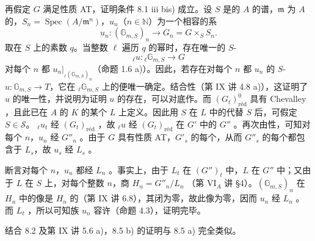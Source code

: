再假定 $G$ 满足性质 AT，证明条件 8.1 iii bis) 成立。设 $S$ 是的 $A$ 的谱，$\mathfrak m$ 为 $A$ 的，$S_n=\operatorname{Spec}(A/\mathfrak m^n)$，$u_n$（$n\in\mathbb N$）为一个相容的系
\[u_n:(\mathbb G_{m,S})_n\longrightarrow G_n=G\times_S S_n.\]
取在 $S$ 上的素数 $q$。当整数 $\ell$ 遍历 $q$ 的幂时，存在唯一的 $S$-
\[{}_\ell u:{}_\ell\mathbb G_{m,S}\longrightarrow G\]
对每个 $n$ 都 $u_n|_{{}_\ell(\mathbb G_{m,S})_n}$（命题 1.6 a)）。因此，若存在对每个 $n$ 都 $u_n$ 的 $S$- $u:\mathbb G_{m,S}\to T$，它在 ${}_\ell\mathbb G_{m,S}$ 上的便唯一确定。结合性（第 IX 讲 4.8 a)），这证明了
$u$ 的唯一性，并说明为证明 $u$ 的存在，可以对底作。而 $(G_t)^0_{\mathrm{r\text{é}d}}$ 具有 Chevalley ，且此已在 $A$ 的 $K$ 的某个 $L$ 上定义。因此用 $S$ 在 $L$ 中的代替 $S$ 后，可假定 $S\in\mathscr S$。 ${}_\ell u_t$ 经 $(G_t)_{\mathrm{r\text{é}d}}$ ，故 ${}_\ell u$ 经 $(G_t)_{\mathrm{r\text{é}d}}$ 在 $G'$ 中的 $G''$ 。再次由性，可知对每个 $n$，$u_n$ 经 $G''_n$ 。由于 $G$ 具有性质 AT，$G'_s$ 的每个，从而 $G''_s$ 的每个都包含于 $L_s$，故 $u_s$ 经 $L_s$ 。

断言对每个 $n$，$u_n$ 都经 $L_n$ 。事实上，由于 $L_t$ 在 $(G'')_t$ 中，$L$ 在 $G''$ 中；又由于 $L$ 在 $S$ 上，对每个整数 $n$，商 $H_n=G''_n/L_n$ （第 VI$_A$ 讲 \S4）。$(\mathbb G_{m,S})_n$ 在 $H_n$ 中的像是 $H_n$ 的（第 IX 讲 6.8），其闭为零，故此像为零，因而 $u_n$ 经 $L_n$ 。而 $L_t$ ，所以可知族 $u_n$ 容许（命题 4.3），证明完毕。

结合 8.2 及第 IX 讲 5.6 a)，8.5 b) 的证明与 8.5 a) 完全类似。

